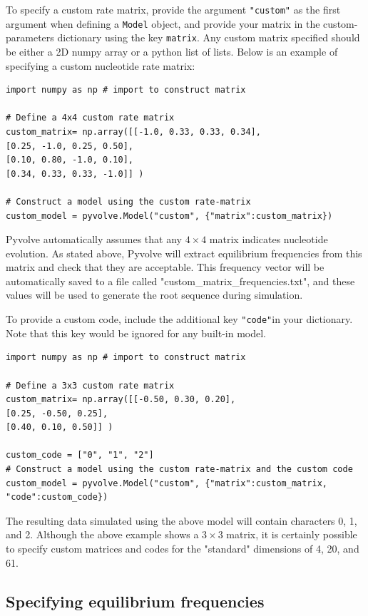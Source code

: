 \documentclass{article}
\newcommand{\code}[1]{\texttt{\small{#1}}}
\begin{document}
To specify a custom rate matrix, provide the argument \code{"custom"} as the first argument when defining a \code{Model} object, and provide your matrix in the custom-parameters dictionary using the key \code{matrix}. Any custom matrix specified should be either a 2D numpy array or a python list of lists. Below is an example of specifying a custom nucleotide rate matrix:
\begin{lstlisting}
import numpy as np # import to construct matrix

# Define a 4x4 custom rate matrix
custom_matrix= np.array([[-1.0, 0.33, 0.33, 0.34], 
[0.25, -1.0, 0.25, 0.50], 
[0.10, 0.80, -1.0, 0.10],
[0.34, 0.33, 0.33, -1.0]] )

# Construct a model using the custom rate-matrix
custom_model = pyvolve.Model("custom", {"matrix":custom_matrix})
\end{lstlisting}
Pyvolve automatically assumes that any $4\times4$ matrix indicates nucleotide evolution. As stated above, Pyvolve will extract equilibrium frequencies from this matrix and check that they are acceptable. This frequency vector will be automatically saved to a file called "custom\_matrix\_frequencies.txt", and these values will be used to generate the root sequence during simulation.

To provide a custom code, include the additional key \code{"code"}in your dictionary. Note that this key would be ignored for any built-in model.
\begin{lstlisting}
import numpy as np # import to construct matrix

# Define a 3x3 custom rate matrix
custom_matrix= np.array([[-0.50, 0.30, 0.20], 
[0.25, -0.50, 0.25], 
[0.40, 0.10, 0.50]] )

custom_code = ["0", "1", "2"]
# Construct a model using the custom rate-matrix and the custom code
custom_model = pyvolve.Model("custom", {"matrix":custom_matrix, "code":custom_code})
\end{lstlisting}

The resulting data simulated using the above model will contain characters 0, 1, and 2. Although the above example shows a $3\times3$ matrix, it is certainly possible to specify custom matrices and codes for the "standard" dimensions of 4, 20, and 61. 



\subsection{Specifying equilibrium frequencies}\label{sec:freqs}
\end{document}
